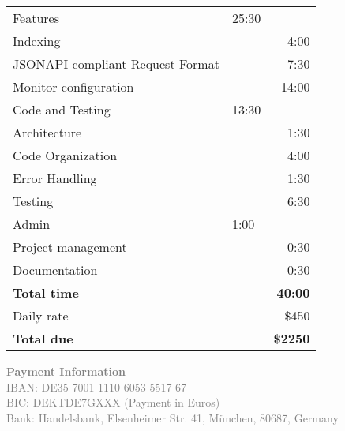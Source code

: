 \documentclass[11pt]{article}
\begin{document}
\begin{table}[htb]
\centering

\begin{tabular}{llr}


\hline

Features & 25:30 & \\
\hspace*{1em} Indexing &  & 4:00\\
\hspace*{1em} JSONAPI-compliant Request Format &  & 7:30\\
\hspace*{1em} Monitor configuration &  & 14:00\\
Code and Testing & 13:30 & \\
\hspace*{1em} Architecture &  & 1:30\\
\hspace*{1em} Code Organization &  & 4:00\\
\hspace*{1em} Error Handling &  & 1:30\\
\hspace*{1em} Testing &  & 6:30\\
Admin & 1:00 & \\
\hspace*{1em} Project management &  & 0:30\\
\hspace*{1em} Documentation &  & 0:30\\
\hline
\textbf{Total time} & & \textbf{	40:00} \\

Daily rate & & \$450 \\

\textbf{Total due} & & \textbf{\$2250} \\
\end{tabular}
\end{table}

\vspace{\fill}



\textcolor{gray}{\small
\textbf{Payment Information}\\
IBAN: DE35 7001 1110 6053 5517 67 \\
BIC: DEKTDE7GXXX  (Payment in Euros) \\
Bank: Handelsbank, Elsenheimer Str. 41, München, 80687, Germany
}
\end{document}
